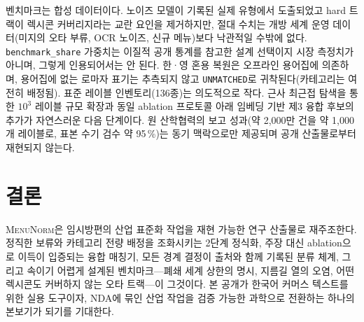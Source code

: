 \documentclass[10pt,twocolumn]{article}
\newcommand{\menunorm}{\textsc{MenuNorm}}
\newcommand{\unmatched}{\texttt{UNMATCHED}}
\begin{document}
벤치마크는 합성 데이터이다. 노이즈 모델이 기록된 실제 유형에서
도출되었고 hard 트랙이 렉시콘 커버리지라는 교란 요인을 제거하지만, 절대
수치는 개방 세계 운영 데이터(미지의 오타 부류, OCR 노이즈, 신규
메뉴)보다 낙관적일 수밖에 없다. \texttt{benchmark\_share} 가중치는
이질적 공개 통계를 참고한 설계 선택이지 시장 측정치가 아니며, 그렇게
인용되어서는 안 된다. 한·영 혼용 복원은 오프라인 용어집에 의존하며,
용어집에 없는 로마자 표기는 추측되지 않고 \unmatched{}로
귀착된다(카테고리는 여전히 배정됨). 표준 레이블 인벤토리(136종)는
의도적으로 작다. 근사 최근접 탐색을 통한 $10^3$ 레이블 규모 확장과 동일
ablation 프로토콜 아래 임베딩 기반 제3 융합 후보의 추가가 자연스러운
다음 단계이다. 원 산학협력의 보고 성과(약 2,000만 건을 약 1,000개
레이블로, 표본 수기 검수 약 95\,\%)는 동기 맥락으로만 제공되며 공개
산출물로부터 재현되지 않는다.

\section{결론}

\menunorm{}은 임시방편의 산업 표준화 작업을 재현 가능한 연구 산출물로
재주조한다. 정직한 보류와 카테고리 전량 배정을 조화시키는 2단계 정식화,
주장 대신 ablation으로 이득이 입증되는 융합 매칭기, 모든 경계 결정이
출처와 함께 기록된 분류 체계, 그리고 속이기 어렵게 설계된
벤치마크---폐쇄 세계 상한의 명시, 지름길 열의 오염, 어떤 렉시콘도
커버하지 않는 오타 트랙---이 그것이다. 본 공개가 한국어 커머스 텍스트를
위한 실용 도구이자, NDA에 묶인 산업 작업을 검증 가능한 과학으로 전환하는
하나의 본보기가 되기를 기대한다.
\end{document}

